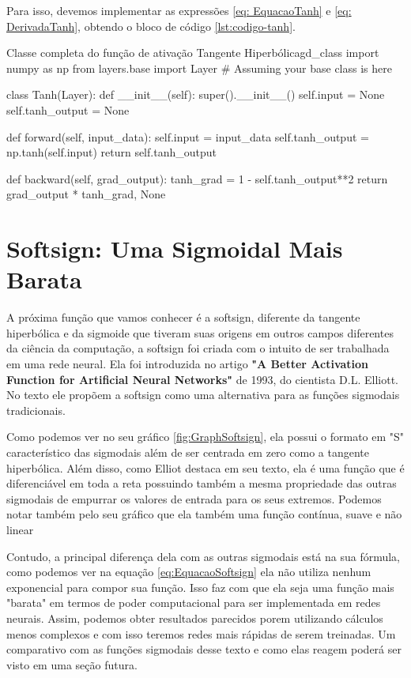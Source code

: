 Para isso, devemos implementar as expressões \ref{eq: EquacaoTanh} e \ref{eq: DerivadaTanh}, obtendo o bloco de código \ref{lst:codigo-tanh}.

\begin{codelisting}{Classe completa do função de ativação Tangente Hiperbólica}{gd_class}
import numpy as np
from layers.base import Layer  # Assuming your base class is here

class Tanh(Layer):
    def __init__(self):
        super().__init__()
        self.input = None
        self.tanh_output = None

    def forward(self, input_data):
        self.input = input_data
        self.tanh_output = np.tanh(self.input)
        return self.tanh_output

    def backward(self, grad_output):
        tanh_grad = 1 - self.tanh_output**2
        return grad_output * tanh_grad, None
\end{codelisting}

\section{Softsign: Uma Sigmoidal Mais Barata}

A próxima função que vamos conhecer é a softsign, diferente da tangente hiperbólica e da sigmoide que tiveram suas origens em outros campos diferentes da ciência da computação, a softsign foi criada com o intuito de ser trabalhada em uma rede neural. Ela foi introduzida no artigo \textbf{"A Better Activation Function for Artificial Neural Networks"} de 1993, do cientista D.L. Elliott. No texto ele propõem a softsign como uma alternativa para as funções sigmodais tradicionais.

Como podemos ver no seu gráfico \ref{fig:GraphSoftsign}, ela possui o formato em "S" característico das sigmodais além de ser centrada em zero como a tangente hiperbólica. Além disso, como Elliot destaca em seu texto, ela é uma função que é diferenciável em toda a reta possuindo também a mesma propriedade das outras sigmodais de empurrar os valores de entrada para os seus extremos. Podemos notar também pelo seu gráfico que ela também uma função contínua, suave e não linear

Contudo, a principal diferença dela com as outras sigmodais está na sua fórmula, como podemos ver na equação \ref{eq:EquacaoSoftsign} ela não utiliza nenhum exponencial para compor sua função. Isso faz com que ela seja uma função mais "barata" em termos de poder computacional para ser implementada em redes neurais. Assim, podemos obter resultados parecidos porem utilizando cálculos menos complexos e com isso teremos redes mais rápidas de serem treinadas. Um comparativo com as funções sigmodais desse texto e como elas reagem poderá ser visto em uma seção futura.


